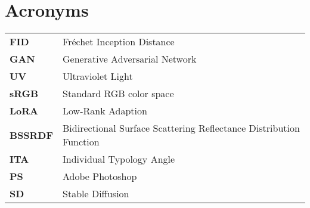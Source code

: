 \chapter*{\centering Acronyms}
\begin{spacing}{1.5}
\setlength{\parskip}{0.3in}

\begin{table}[ht]
\centering
\begin{tabular}{ll}
\textbf{FID} & Fréchet Inception Distance \\
\textbf{GAN} & Generative Adversarial Network \\
\textbf{UV} & Ultraviolet Light \\
\textbf{sRGB} & Standard RGB color space \\
\textbf{LoRA} & Low-Rank Adaption \\
\textbf{BSSRDF} & Bidirectional Surface Scattering Reflectance Distribution Function \\
\textbf{ITA} & Individual Typology Angle\\
\textbf{PS} & Adobe Photoshop \\
\textbf{SD} & Stable Diffusion \\
\end{tabular}%
\end{table}

\end{spacing}
\newpage
